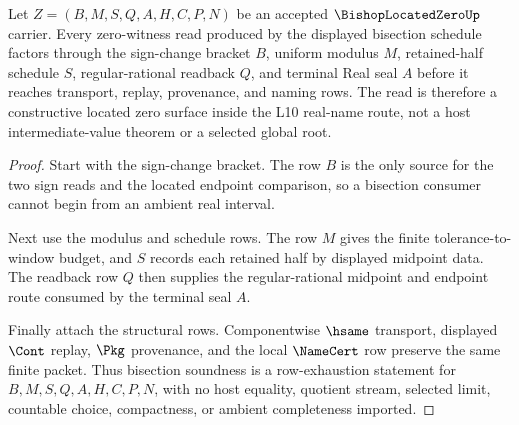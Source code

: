 \begin{theorem}
\label{thm:bishop-located-zero-bisection-soundness}
Let $Z=(B,M,S,Q,A,H,C,P,N)$ be an accepted $\BishopLocatedZeroUp$ carrier. Every zero-witness read produced by the displayed bisection schedule factors through the sign-change bracket $B$, uniform modulus $M$, retained-half schedule $S$, regular-rational readback $Q$, and terminal Real seal $A$ before it reaches transport, replay, provenance, and naming rows. The read is therefore a constructive located zero surface inside the L10 real-name route, not a host intermediate-value theorem or a selected global root.
\end{theorem}
\begin{proof}
Start with the sign-change bracket. The row $B$ is the only source for the two sign reads and the located endpoint comparison, so a bisection consumer cannot begin from an ambient real interval.

Next use the modulus and schedule rows. The row $M$ gives the finite tolerance-to-window budget, and $S$ records each retained half by displayed midpoint data. The readback row $Q$ then supplies the regular-rational midpoint and endpoint route consumed by the terminal seal $A$.

Finally attach the structural rows. Componentwise $\hsame$ transport, displayed $\Cont$ replay, $\Pkg$ provenance, and the local $\NameCert$ row preserve the same finite packet. Thus bisection soundness is a row-exhaustion statement for $B,M,S,Q,A,H,C,P,N$, with no host equality, quotient stream, selected limit, countable choice, compactness, or ambient completeness imported.
\end{proof}




